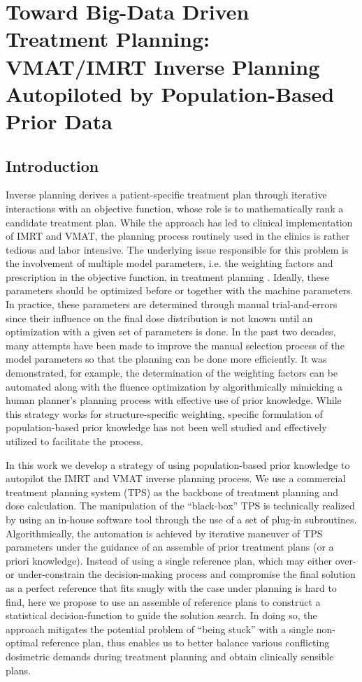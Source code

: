 \chapter{Toward Big-Data Driven Treatment Planning: VMAT/IMRT Inverse Planning Autopiloted by Population-Based Prior Data}  \label{cha:chap4}
        
 \section{Introduction}
Inverse planning derives a patient-specific treatment plan through iterative interactions with an objective function, whose role is to mathematically rank a candidate treatment plan.  While the approach has led to clinical implementation of IMRT and VMAT, the planning process routinely used in the clinics is rather tedious and labor intensive. The underlying issue responsible for this problem is the involvement of multiple model parameters, i.e. the weighting factors and prescription in the objective function, in treatment planning \cite{xing1999a, yu2000}. Ideally, these parameters should be optimized before or together with the machine parameters. In practice, these parameters are determined through manual trial-and-errors since their influence on the final dose distribution is not known until an optimization with a given set of parameters is done. In the past two decades, many attempts have been made to improve the manual selection process of the model parameters so that the planning can be done more efficiently. It was demonstrated, for example, the determination of the weighting factors can be automated along with the fluence optimization by algorithmically mimicking a human planner's planning process with effective use of prior knowledge\cite{good2013,lian2013,purdie2011,xing1999a,zaghian2014}. While this strategy works for structure-specific weighting, specific formulation of population-based prior knowledge has not been well studied and effectively utilized to facilitate the process. 

In this work we develop a strategy of using population-based prior knowledge to autopilot the IMRT and VMAT inverse planning process. We use a commercial treatment planning system (TPS) as the backbone of treatment planning and dose calculation. The manipulation of the ``black-box'' TPS is technically realized by using an in-house software tool through the use of a set of plug-in subroutines. Algorithmically, the automation is achieved by iterative maneuver of TPS parameters under the guidance of an assemble of prior treatment plans (or a priori knowledge). Instead of using a single reference plan, which may either over- or under-constrain the decision-making process and compromise the final solution as a perfect reference that fits snugly with the case under planning is hard to find, here we propose to use an assemble of reference plans to construct a statistical decision-function to guide the solution search.  In doing so, the approach mitigates the potential problem of ``being stuck'' with a single non-optimal reference plan, thus enables us to better balance various conflicting dosimetric demands during treatment planning and obtain clinically sensible plans.
 
